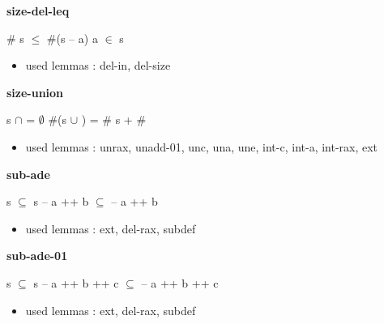 \documentclass[a4paper]{article}
\begin{document}
\medskip

\bigskip

{\large\bf size-del-leq}

\medskip

 \Fol \# s $\le$ \#(s -- a) \Equiv \Not a $\in$ s

\begin{itemize}


\item       used lemmas  : del-in, del-size

\end{itemize}

\medskip

\bigskip

{\large\bf size-union}

\medskip

 \Fol s $\cap$  = $\emptyset$ \Imp \#(s $\cup$ ) = \# s + \# 

\begin{itemize}


\item       used lemmas  : unrax, unadd-01, unc, una, une, int-c, int-a, int-rax, ext

\end{itemize}

\medskip

\bigskip

{\large\bf sub-ade}

\medskip

 \Fol s $\subseteq$  \Imp s -- a ++ b $\subseteq$  -- a ++ b

\begin{itemize}


\item       used lemmas  : ext, del-rax, subdef

\end{itemize}

\medskip

\bigskip

{\large\bf sub-ade-01}

\medskip

 \Fol s $\subseteq$  \Imp s -- a ++ b ++ c $\subseteq$  -- a ++ b ++ c

\begin{itemize}


\item       used lemmas  : ext, del-rax, subdef

\end{itemize}
\end{document}
